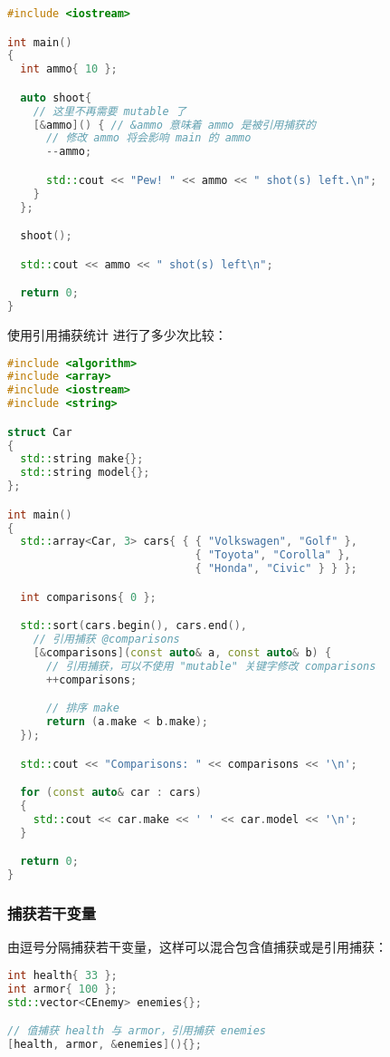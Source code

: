 \documentclass[../../LearnCpp.tex]{subfiles}
\begin{document}
\begin{lstlisting}[language=C++]
#include <iostream>

int main()
{
  int ammo{ 10 };

  auto shoot{
    // 这里不再需要 mutable 了
    [&ammo]() { // &ammo 意味着 ammo 是被引用捕获的
      // 修改 ammo 将会影响 main 的 ammo
      --ammo;

      std::cout << "Pew! " << ammo << " shot(s) left.\n";
    }
  };

  shoot();

  std::cout << ammo << " shot(s) left\n";

  return 0;
}
\end{lstlisting}

使用引用捕获统计  进行了多少次比较：

\begin{lstlisting}[language=C++]
#include <algorithm>
#include <array>
#include <iostream>
#include <string>

struct Car
{
  std::string make{};
  std::string model{};
};

int main()
{
  std::array<Car, 3> cars{ { { "Volkswagen", "Golf" },
                             { "Toyota", "Corolla" },
                             { "Honda", "Civic" } } };

  int comparisons{ 0 };

  std::sort(cars.begin(), cars.end(),
    // 引用捕获 @comparisons
    [&comparisons](const auto& a, const auto& b) {
      // 引用捕获，可以不使用 "mutable" 关键字修改 comparisons
      ++comparisons;

      // 排序 make
      return (a.make < b.make);
  });

  std::cout << "Comparisons: " << comparisons << '\n';

  for (const auto& car : cars)
  {
    std::cout << car.make << ' ' << car.model << '\n';
  }

  return 0;
}
\end{lstlisting}

\subsubsection*{捕获若干变量}

由逗号分隔捕获若干变量，这样可以混合包含值捕获或是引用捕获：

\begin{lstlisting}[language=C++]
int health{ 33 };
int armor{ 100 };
std::vector<CEnemy> enemies{};

// 值捕获 health 与 armor，引用捕获 enemies
[health, armor, &enemies](){};
\end{lstlisting}
\end{document}
